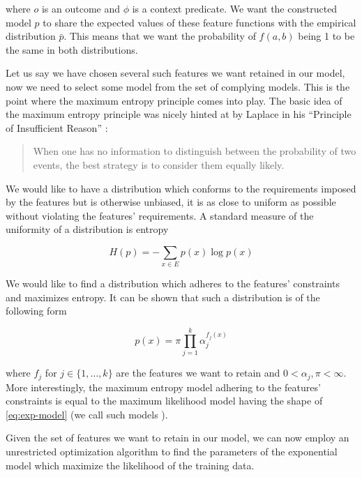 where $o$ is an outcome and $\phi$ is a context predicate. We want the constructed
model $p$ to share the expected values of these feature functions with the
empirical distribution $\bar{p}$. This means that we want the probability of
$f(a,b)$ being 1 to be the same in both distributions.

Let us say we have chosen several such features we want retained in our model,
now we need to select some model from the set of complying models. This is the
point where the maximum entropy principle comes into play. The basic
idea of the maximum entropy principle was nicely hinted at by Laplace in his
``Principle of Insufficient Reason'' \cite{maxent-approach}:

\begin{quote}
When one has no information to distinguish between the probability of two
events, the best strategy is to consider them equally likely.
\end{quote}

We would like to have a distribution which conforms to the requirements imposed
by the features but is otherwise unbiased, it is as close to uniform as
possible without violating the features' requirements. A standard measure of
the uniformity of a distribution is entropy

\begin{equation}
\label{eq:entropy}
H(p) = -\sum_{x \in E} p(x) \log p(x)
\end{equation}

We would like to find a distribution which adheres to the features' constraints
and maximizes entropy. It can be shown \cite{maxent-approach,maxent-simple} that
such a distribution is of the following form

\begin{equation}
\label{eq:exp-model}
p(x) = \pi \prod_{j=1}^k \alpha_j^{f_j(x)}
\end{equation}

where $f_j$ for $j \in \{1,\dotsc,k\}$ are the features we want to retain and
$0 < \alpha_j,\pi < \infty$. More interestingly, the maximum entropy model
adhering to the features' constraints is equal to the maximum likelihood model
having the shape of \ref{eq:exp-model} (we call such models
). 

Given the set of features we want to retain in our model, we can now employ an
unrestricted optimization algorithm to find the parameters of the exponential
model which maximize the likelihood of the training data.

